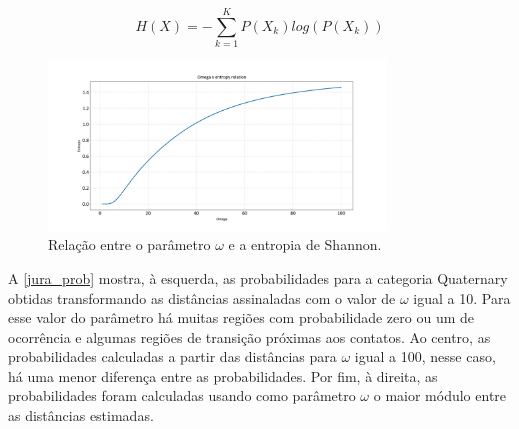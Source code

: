 \begin{equation}
	H(X)=-\sum_{k=1}^{K}P(X_{k})log(P(X_{k}))
    \label{shannon_entr}
\end{equation}

\begin{figure}[H]
\caption{\label{omega_ent} Relação entre o parâmetro $\omega$ e a entropia de Shannon.}
	\centering
		\includegraphics[width=0.8\textwidth]{capitulo_2/imagens/omega_entropy.png}
\end{figure}

A \autoref{jura_prob} mostra, à esquerda, as probabilidades para a categoria Quaternary obtidas transformando as distâncias assinaladas com o valor de $\omega$ igual a 10. Para esse valor do parâmetro há muitas regiões com probabilidade zero ou um de ocorrência e algumas regiões de transição próximas aos contatos. Ao centro, as probabilidades calculadas a partir das distâncias para $\omega$ igual a 100, nesse caso, há uma menor diferença entre as probabilidades. Por fim, à direita, as probabilidades foram calculadas usando como parâmetro $\omega$ o maior módulo entre as distâncias estimadas.

